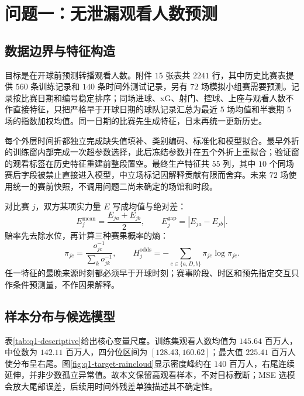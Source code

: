 \section{问题一：无泄漏观看人数预测}

\subsection{数据边界与特征构造}

目标是在开球前预测转播观看人数。附件 $15$ 张表共 $2241$ 行，其中历史比赛表提供 $560$ 条训练记录和 $140$ 条时间外测试记录，另有 $72$ 场模拟小组赛需要预测。记录按比赛日期和编号稳定排序；同场进球、xG、射门、控球、上座与观看人数不作直接特征，只把严格早于开球日期的球队记录汇总为最近 $5$ 场均值和半衰期 $5$ 场的指数加权均值。同一日期的比赛先生成特征，日末再统一更新历史。

每个外层时间折都独立完成缺失值填补、类别编码、标准化和模型拟合。最早外折的训练窗内部完成一次超参数选择，此后冻结参数并在五个外折上重拟合；验证窗的观看标签在历史特征重建前整段置空。最终生产特征共 $55$ 列，其中 $10$ 个同场赛后字段被禁止直接进入模型，中立场标记因解释贡献有限而舍弃。未来 $72$ 场使用统一的赛前快照，不调用问题二尚未确定的场馆和时段。

对比赛 $j$，双方某项实力量 $E$ 写成均值与绝对差：
\begin{equation}
E_j^{\mathrm{mean}}=\frac{E_{ja}+E_{jb}}{2},\qquad
E_j^{\mathrm{gap}}=|E_{ja}-E_{jb}|.
\end{equation}
赔率先去除水位，再计算三种赛果概率的熵：
\begin{equation}
\pi_{jc}=\frac{o_{jc}^{-1}}{\sum_k o_{jk}^{-1}},\qquad
H_j^{\mathrm{odds}}=-\sum_{c\in\{a,D,b\}}\pi_{jc}\log\pi_{jc}.
\end{equation}
任一特征的最晚来源时刻都必须早于开球时刻；赛事阶段、时区和预先指定交互只作条件预测量，不作因果解释。

\subsection{样本分布与候选模型}

表\ref{tab:q1-descriptive}给出核心变量尺度。训练集观看人数均值为 $145.64$ 百万人，中位数为 $142.11$ 百万人，四分位区间为 $[128.43,160.62]$；最大值 $225.41$ 百万人使分布呈右尾。图\ref{fig:q1-target-raincloud}显示密度峰约在 $140$ 百万人，右尾连续延伸，并非少数孤立异常值。故本文保留高观看样本，不对目标截断；MSE 选模会放大尾部误差，后续用时间外残差单独描述其不确定性。



